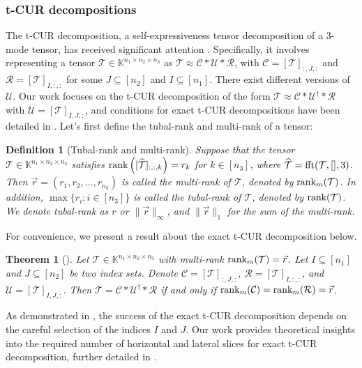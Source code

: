 \documentclass[twoside,12pt]{article}
\newtheorem{theorem}{Theorem}
\newtheorem{definition}{Definition}
\def\rank{\textnormal{rank}}
\def\mcR{\mathcal{R}}
\def\mcC{\mathcal{C}}
\def\fft{\textnormal{fft}}
\def\T{\mathcal{T}}
\def\rank{\textnormal{rank}}
\def\mcR{\mathcal{R}}
\def\mcC{\mathcal{C}}
\def\fft{\textnormal{fft}}
\def\T{\mathcal{T}}
\begin{document}
\subsubsection{\textnormal{t-CUR decompositions}} 
The t-CUR decomposition, a self-expressiveness tensor decomposition of a  3-mode tensor,  has received significant attention {\citep{ahmadi2023adaptive,weiyimin,hamm2023generalized, %
Tarzanagh2018}}. 
Specifically, it involves representing a tensor $\T \in \mathbb{K}^{n_1 \times n_2 \times n_3}$ as $\T \approx \mcC \ast \mathcal{U} \ast \mcR$, with $\mathcal{C}=[\T]_{:,J,:}$ and $\mathcal{R}=[\T]_{I,:,:}$ for some $J \subseteq [n_2]$ and $I \subseteq [n_1]$. 
There exist different versions of $\mathcal{U}$. Our work focuses on the t-CUR decomposition  of the form $\T \approx \mcC \ast \mathcal{U}^{\dagger}  \ast \mcR$ with $\mathcal{U}=[\T]_{I,J,:}$, and conditions for exact t-CUR decompositions have been detailed in  \citep{weiyimin,hamm2023generalized}. Let's first define the tubal-rank and multi-rank of a tensor:
\begin{definition}[Tubal-rank and multi-rank] 
 \label{multirank}Suppose that the tensor $\mathcal{T} \in \mathbb{K}^{n_1 \times n_2 \times n_3}$ satisfies $\rank\left([\widehat{\mathcal{T}}]_{:,:,k}\right)=r_k$ for $k \in [n_3]$, where $\widehat{\T}=\fft(\T,[],3)$. Then $\vec{r}=\left(r_1, r_2, \ldots, r_{n_3}\right)$ is called the multi-rank of $\mathcal{T}$, denoted by $\rank_{m}(\mathcal{T})$. In addition, $\max\{r_i:i\in[n_3]\}$ is called the tubal-rank of $\mathcal{T}$, denoted by $\rank(\mathcal{T})$. We denote tubal-rank as $r$ or $\|\vec{r}\|_{\infty}$, and $\|\vec{r}\|_{1}$ for the sum of the multi-rank.
\end{definition}
For convenience, we present a result about the exact t-CUR decomposition below. 
\begin{theorem}[\cite{weiyimin}]
\label{tensor_cur}\rm
Let $\mathcal{T} \in \mathbb{K}^{n_1 \times n_2 \times n_3}$ with multi-rank $\rank_m(\mathcal{T})=\vec{r}$. Let $I \subseteq [n_1]$ and $J \subseteq [n_2]$ be two index sets. Denote $\mathcal{C}=[\mathcal{T}]_{:, J,:}$, $\mathcal{R}=[\mathcal{T}]_{I,:,:}$, and $\mathcal{U}=[\mathcal{T}]_{I, J,:}$. Then $\mathcal{T}=\mathcal{C} \ast \mathcal{U}^{\dagger} \ast \mathcal{R}$ if and only if $\rank_m(\mathcal{C})=\rank_m(\mathcal{R})=\vec{r}$.
\end{theorem} 
As demonstrated in , the success of the exact t-CUR decomposition depends on the careful selection of the indices $I$ and $J$. 
Our work provides theoretical insights into the required number of horizontal and lateral slices for exact t-CUR decomposition, further detailed in . 
\end{document}
